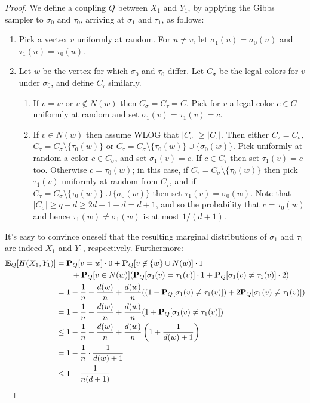 \documentclass[11pt]{article} \usepackage{amssymb}
\newcommand{\E}{{\bf E}} \newcommand{\Cov}{{\bf Cov}}
\begin{document}
\begin{itemize}
\begin{proof}
  We define a coupling $Q$ between $X_1$ and $Y_1$, 
  by applying the Gibbs sampler to $\sigma_0$ and $\tau_0$, arriving at 
  $\sigma_1$ and $\tau_1$, as follows:
  \begin{enumerate}
  \item Pick a vertex $v$ uniformly at random. For $u\neq v$, let 
    $\sigma_1(u)=\sigma_0(u)$ and $\tau_1(u)=\tau_0(u)$.
  \item Let $w$ be the vertex for which $\sigma_0$ and $\tau_0$ differ. Let 
    $C_\sigma$ be the legal colors for $v$ under $\sigma_0$, and define
    $C_\tau$ similarly.
    \begin{enumerate}
    \item If $v=w$ or $v \not \in N(w)$ then $C_\sigma=C_\tau=C$. Pick for $v$ a legal 
      color $c\in C$ uniformly at random and set $\sigma_1(v)=\tau_1(v)=c$.
    \item If $v \in N(w)$ then assume WLOG that $|C_\sigma|\geq |C_\tau|$.
      Then either $C_\tau=C_\sigma$,  $C_\tau=C_\sigma\setminus \{\tau_0(w)\}$ or
      $C_\tau=C_\sigma\setminus \{\tau_0(w)\}\cup \{\sigma_0(w)\}$.
      Pick uniformly at random
      a color $c\in C_\sigma$, and set $\sigma_1(v)=c$. If $c\in C_\tau$ then
      set $\tau_1(v)=c$ too. Otherwise $c=\tau_0(w)$; in this case, if  
      $C_\tau=C_\sigma\setminus \{\tau_0(w)\}$ 
      then pick $\tau_1(v)$ uniformly at random from $C_\tau$, and if 
      $C_\tau=C_\sigma\setminus \{\tau_0(w)\}\cup \{\sigma_0(w)\}$ then
      set $\tau_1(v)=\sigma_0(w)$. Note that $|C_\sigma|\geq q-d \geq 2d+1-d =d+1$, and
      so the probability that $c=\tau_0(w)$ and hence 
      $\tau_1(w)\neq  \sigma_1(w)$ is at most
      $1/(d+1)$.
    \end{enumerate}
  \end{enumerate}
  It's easy to convince oneself that the resulting marginal distributions 
  of $\sigma_1$ and $\tau_1$ are indeed $X_1$ and $Y_1$, respectively. Furthermore:
  \begin{align*}
    \E_Q[H(X_1,Y_1)] &= \P_Q[v=w]\cdot 0+\P_Q[v\not \in \{w\}\cup N(w)]\cdot 1
    \\ & \quad\quad + \P_Q[v\in N(w)](\P_Q[\sigma_1(v)=\tau_1(v)]\cdot 1 + \P_Q[\sigma_1(v)\neq\tau_1(v)]\cdot 2)
    \\  &= 1-{1\over n}-{d(w)\over n}+{d(w)\over n}((1-\P_Q[\sigma_1(v)\neq\tau_1(v)]) +2\P_Q[\sigma_1(v)\neq\tau_1(v)])
    \\  &= 1-{1\over n}-{d(w)\over n}+{d(w)\over n}(1+\P_Q[\sigma_1(v)\neq\tau_1(v)])
    \\  &\leq 1-{1\over n}-{d(w)\over n}+{d(w)\over n}\left(1+{1\over d(w)+1}\right)
    \\  &= 1-{1\over n}\cdot{1\over d(w)+1}
    \\  &\leq 1-{1\over n(d+1)}
  \end{align*}
\end{proof}



\end{itemize}
\end{document}
